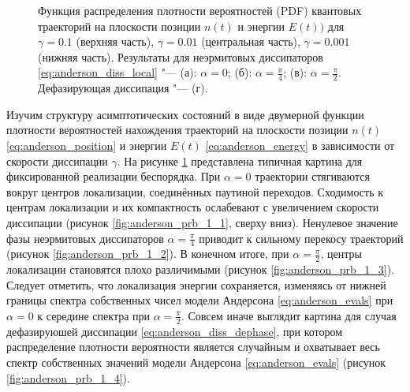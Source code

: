 \begin{figure}[ht]
	\legend{}
	\caption[Плотность вероятностей квантовых траекторий на плоскости позиции и энергий в зависимости от параметров и скорости неэрмитовой диссипации]
	{
		Функция распределения плотности вероятностей (PDF) квантовых траекторий на плоскости позиции \(n(t)\) и энергии \(E(t))\) для \(\gamma=0.1\) (верхняя часть),  \(\gamma=0.01\) (центральная часть),  \(\gamma=0.001\) (нижняя часть). Результаты для неэрмитовых диссипаторов \cref{eq:anderson_diss_local} "--- (а): \(\alpha=0\); (б): \(\alpha=\frac{\pi}{4}\); (в): \(\alpha=\frac{\pi}{2}\). Дефазирующая диссипация "--- (г).
	}
	\label{fig:anderson_prb_1}
\end{figure}

Изучим структуру асимптотических состояний в виде двумерной функции плотности вероятностей нахождения траекторий на плоскости позиции \(n(t)\) \cref{eq:anderson_position} и энергии \(E(t)\) \cref{eq:anderson_energy} в зависимости от скорости диссипации \(\gamma\). На рисунке \cref{fig:anderson_prb_1} представлена типичная картина для фиксированной реализации беспорядка. 
При \(\alpha=0\) траектории стягиваются вокруг центров локализации, соединённых паутиной переходов. 
Сходимость к центрам локализации и их компактность ослабевают с увеличением скорости диссипации (рисунок \cref{fig:anderson_prb_1_1}, сверху вниз).
Ненулевое значение фазы неэрмитовых диссипаторов \(\alpha=\frac{\pi}{4}\) приводит к сильному перекосу траекторий (рисунок \cref{fig:anderson_prb_1_2}). 
В конечном итоге, при \(\alpha=\frac{\pi}{2}\), центры локализации становятся плохо различимыми (рисунок \cref{fig:anderson_prb_1_3}). 
Следует отметить, что локализация энергии сохраняется, изменяясь от нижней границы спектра собственных чисел модели Андерсона \cref{eq:anderson_evals} при \(\alpha=0\) к середине спектра при \(\alpha=\frac{\pi}{2}\). 
Совсем иначе выглядит картина для случая дефазируюшей диссипации \cref{eq:anderson_diss_dephase}, при котором распределение плотности вероятности является случайным и охватывает весь спектр собственных значений модели Андерсона \cref{eq:anderson_evals} (рисунок \cref{fig:anderson_prb_1_4}).

